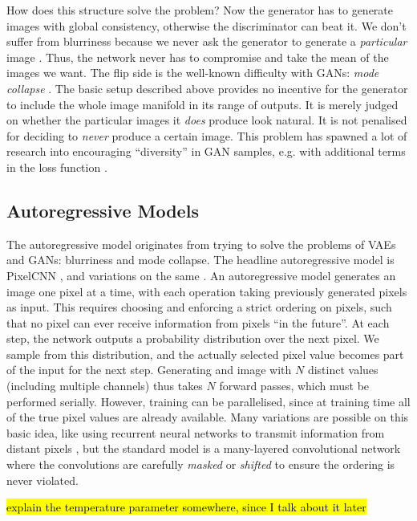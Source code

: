 \documentclass[10pt,a4paper]{article}
\newcommand{\nquote}[1]{``{#1}''}
\begin{document}
How does this structure solve the problem? Now the generator has to generate images with global consistency, otherwise the discriminator can beat it. We don't suffer from blurriness because we never ask the generator to generate a \emph{particular} image \cite{??}. Thus, the network never has to compromise and take the mean of the images we want. The flip side is the well-known difficulty with GANs: \emph{mode collapse} \cite{??}. The basic setup described above provides no incentive for the generator to include the whole image manifold in its range of outputs. It is merely judged on whether the particular images it \emph{does} produce look natural. It is not penalised for deciding to \emph{never} produce a certain image. This problem has spawned a lot of research into encouraging \nquote{diversity} in GAN samples, e.g. with additional terms in the loss function \cite{??,??,??}.

\subsection{Autoregressive Models}

The autoregressive model originates from trying to solve the problems of VAEs and GANs: blurriness and mode collapse. The headline autoregressive model is PixelCNN \cite{pixelcnn2}, and variations on the same \cite{pixelcnn3,pixelcnn++,superres,wavenet,bytenet,videopixel}. An autoregressive model generates an image one pixel at a time, with each operation taking previously generated pixels as input. This requires choosing and enforcing a strict ordering on pixels, such that no pixel can ever receive information from pixels \nquote{in the future}. At each step, the network outputs a probability distribution over the next pixel. We sample from this distribution, and the actually selected pixel value becomes part of the input for the next step. Generating and image with $N$ distinct values (including multiple channels) thus takes $N$ forward passes, which must be performed serially. However, training can be parallelised, since at training time all of the true pixel values are already available. Many variations are possible on this basic idea, like using recurrent neural networks to transmit information from distant pixels \cite{pixelcnn1}, but the standard model is a many-layered convolutional network where the convolutions are carefully \emph{masked} \cite{pixelcnn2} or \emph{shifted} \cite{pixelcnn++} to ensure the ordering is never violated.

\hl{explain the temperature parameter somewhere, since I talk about it later}
\end{document}
